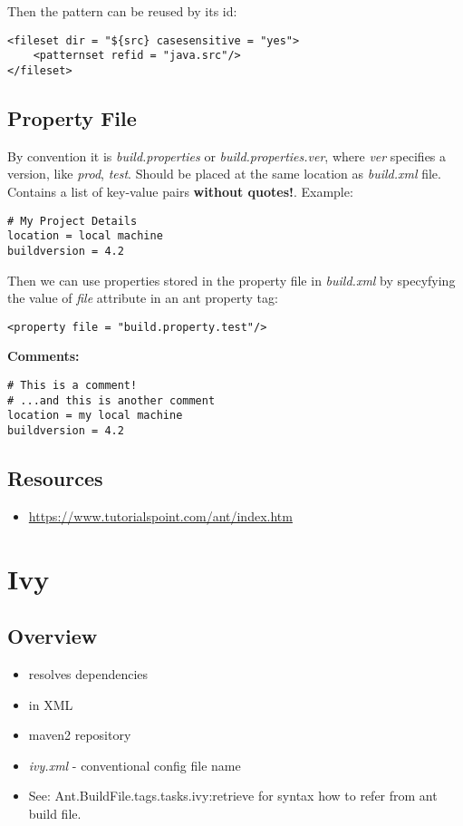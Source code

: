 \documentclass{report}
\begin{document}
Then the pattern can be reused by its id:
\begin{verbatim}
<fileset dir = "${src} casesensitive = "yes">
	<patternset refid = "java.src"/>
</fileset>
\end{verbatim}



\chapter{Property File}
By convention it is \textit{build.properties} or \textit{build.properties.ver},
where \textit{ver} specifies a version, like \textit{prod}, \textit{test}.
Should be placed at the same location as \textit{build.xml} file.
Contains a list of key-value pairs \textbf{without quotes!}. Example:

\begin{verbatim}
# My Project Details
location = local machine
buildversion = 4.2
\end{verbatim}

Then we can use properties stored in the property file in \textit{build.xml}
by specyfying the value of \textit{file} attribute in an ant property tag:
\begin{verbatim}
<property file = "build.property.test"/>
\end{verbatim}

\textbf{Comments:}
\begin{verbatim}
# This is a comment!
# ...and this is another comment
location = my local machine
buildversion = 4.2
\end{verbatim}



\chapter{Resources}

\begin{itemize}
  \item \url{https://www.tutorialspoint.com/ant/index.htm}
\end{itemize}




\part{Ivy}



\chapter{Overview}
\begin{itemize}
  \item resolves dependencies
  \item in XML
  \item maven2 repository
  \item \textit{ivy.xml} - conventional config file name
  \item See: Ant.BuildFile.tags.tasks.ivy:retrieve for syntax how to refer from ant
  build file.
\end{itemize}
\end{document}
